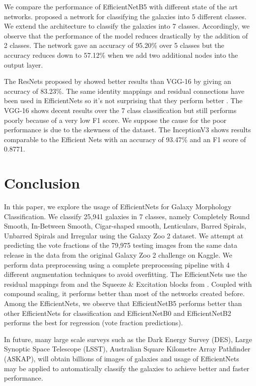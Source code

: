 \documentclass[fleqn,usenatbib]{mnras}
\begin{document}
\hspace*{0.25 in}We compare the performance of EfficientNetB5 with different state of the art networks. \citet{dai2018galaxy} proposed a network for classifying the galaxies into 5 different classes. We extend the architecture to classify the galaxies into 7 classes. Accordingly, we observe that the performance of the model reduces drastically by the addition of 2 classes. The network gave an accuracy of 95.20\% over 5 classes but the accuracy reduces down to 57.12\% when we add two additional nodes into the output layer.


The ResNets proposed by \citet{he2016} showed better results than VGG-16 by giving an accuracy of 83.23\%. The same identity mappings and residual connections have been used in EfficientNets so it's not surprising that they perform better \citep{tan2019efficientnet}. The VGG-16 shows decent results over the 7 class classification but still performs poorly because of a very low F1 score. We suppose the cause for the poor performance is due to the skewness of the dataset. The InceptionV3 shows results comparable to the Efficient Nets with an accuracy of 93.47\% and an F1 score of 0.8771.

\section{Conclusion}
\hspace*{0.25 in}In this paper, we explore the usage of EfficientNets for Galaxy Morphology Classification. We classify 25,941 galaxies in 7 classes, namely Completely Round Smooth, In-Between Smooth, Cigar-shaped smooth, Lenticulars, Barred Spirals, Unbarred Spirals and Irregular using the Galaxy Zoo 2 dataset.  We attempt at predicting the vote fractions of the 79,975 testing images from the same data release in the data from the original Galaxy Zoo 2 challenge on Kaggle. We perform data preprocessing using a complete preprocessing pipeline with 4 different augmentation techniques to avoid overfitting. The EfficientNets use the residual mappings from \citet{he2016} and the Squeeze \& Excitation blocks from \citet{hu2018squeeze}. Coupled with compound scaling, it performs better than most of the networks created before. Among the EfficientNets, we observe that EfficientNetB5 performs better than other EfficientNets for classification and EfficientNetB0 and EfficientNetB2 performs the best for regression (vote fraction predictions).

In future, many large scale surveys such as the Dark Energy Survey (DES), Large Synoptic Space Telescope (LSST), Australian Square Kilometre Array Pathfinder (ASKAP), will obtain billions of images of galaxies and usage of EfficientNets may be applied to automatically classify the galaxies to achieve better and faster performance.
\end{document}
